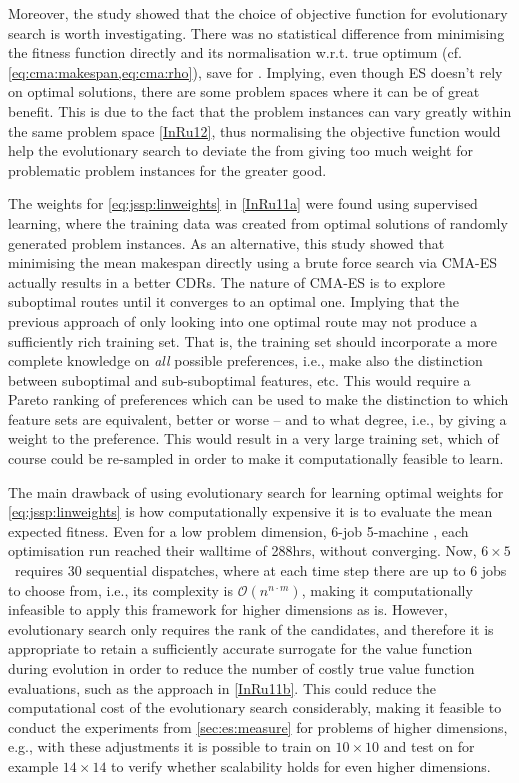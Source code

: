 Moreover, the study showed that the choice of objective function  for 
evolutionary search is worth investigating. There was no statistical difference 
from minimising the fitness function directly and its normalisation w.r.t. true 
optimum (cf. \cref{eq:cma:makespan,eq:cma:rho}), save for . 
Implying, even though ES doesn't rely on optimal solutions, there are some 
problem spaces where it can be of great benefit. This is due to the fact that 
the problem instances can vary greatly within the same problem space 
\cref{InRu12}, thus normalising the objective function would help the 
evolutionary search to deviate the from giving too much weight for problematic 
problem instances for the greater good.

The weights for \cref{eq:jssp:linweights} in \cref{InRu11a} were found using 
supervised learning, where the training data was created from optimal solutions 
of randomly generated problem instances. As an alternative, this study showed  
that minimising the mean makespan directly using a brute force search via 
CMA-ES actually results in a better CDRs. The nature of CMA-ES is to explore 
suboptimal routes until it converges to an optimal one. Implying that the 
previous approach of only looking into one optimal route may not produce a 
sufficiently rich training set. That is, the training set should incorporate a 
more complete knowledge on \emph{all} possible preferences, i.e., make also the 
distinction between suboptimal and sub-suboptimal features, etc.  This would 
require a Pareto ranking of preferences which can be used to make the 
distinction to which feature sets are equivalent, better or worse -- and to 
what degree, i.e., by giving a weight to the preference. This would result in a 
very large training set, which of course could be re-sampled in order to make 
it computationally feasible to learn.

The main drawback of using evolutionary search for learning optimal weights for \cref{eq:jssp:linweights} is how computationally expensive it is to evaluate the mean expected fitness. Even for a low problem dimension, 6-job 5-machine \JSP , each optimisation run reached their walltime of 288hrs, without converging. Now, $6\times5$ \JSP\ requires 30 sequential dispatches, where at each time step there are up to $6$ jobs to choose from, i.e., its complexity is $\mathcal{O}(n^{n\cdot m})$, making it computationally infeasible to apply this framework for higher dimensions as is. 
However, evolutionary search only requires the rank of the candidates, and 
therefore it is appropriate to retain a sufficiently accurate surrogate for the 
value function during evolution in order to reduce the number of costly true 
value function evaluations, such as the approach in \cref{InRu11b}. This could 
reduce the computational cost of the evolutionary search considerably, making 
it feasible to conduct the experiments from \cref{sec:es:measure} for problems 
of higher dimensions, e.g., with these adjustments it is possible to train on 
$10\times10$ and test on for example $14\times14$ to verify whether scalability 
holds for even higher dimensions.  





